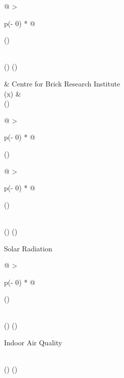 \documentclass[
]{article}
\begin{document}
\begin{longtable}[]
{\begin{minipage}[t]{\linewidth}
\begin{longtable}[]{@{}
  >{\raggedright\arraybackslash}p{(\columnwidth - 0\tabcolsep) * }@{}}
\toprule()
\begin{minipage}[b]{\linewidth}\raggedright
\end{minipage} \\
\midrule()
\endhead
\bottomrule()
\end{longtable}
\end{minipage}} & Centre for Brick Research Institute \\
(x) &
 \\
\bottomrule()
\end{longtable}

\begin{longtable}[]{@{}
  >{\raggedright\arraybackslash}p{(\columnwidth - 0\tabcolsep) * }@{}}
\toprule()
\begin{minipage}[b]{\linewidth}\raggedright
\begin{longtable}[]{@{}
  >{\raggedright\arraybackslash}p{(\columnwidth - 0\tabcolsep) * }@{}}
\toprule()
\begin{minipage}[b]{\linewidth}\raggedright
\end{minipage} \\
\midrule()
\endhead
\bottomrule()
\end{longtable}

Solar Radiation

\begin{longtable}[]{@{}
  >{\raggedright\arraybackslash}p{(\columnwidth - 0\tabcolsep) * }@{}}
\toprule()
\begin{minipage}[b]{\linewidth}\raggedright
\end{minipage} \\
\midrule()
\endhead
\bottomrule()
\end{longtable}

Indoor Air Quality
\end{minipage} \\
\midrule()
\endhead
\bottomrule()
\end{longtable}
\end{document}

